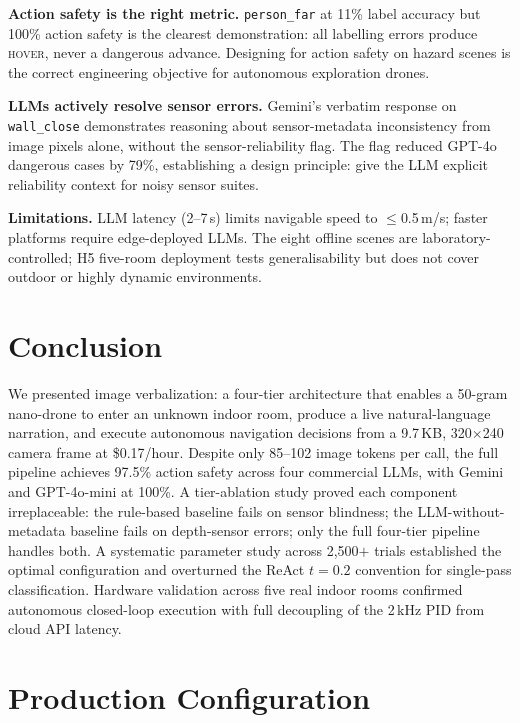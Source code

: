 \documentclass[journal]{IEEEtran}
\begin{document}
\textbf{Action safety is the right metric.}
\texttt{person\_far} at 11\% label accuracy but 100\% action
safety is the clearest demonstration: all labelling errors produce
\textsc{hover}, never a dangerous advance.
Designing for action safety on hazard scenes is the correct
engineering objective for autonomous exploration drones.

\textbf{LLMs actively resolve sensor errors.}
Gemini's verbatim response on \texttt{wall\_close} demonstrates
reasoning about sensor-metadata inconsistency from image pixels
alone, without the sensor-reliability flag.
The flag reduced GPT-4o dangerous cases by 79\%, establishing a
design principle: give the LLM explicit reliability context for
noisy sensor suites.

\textbf{Limitations.}
LLM latency (2--7\,s) limits navigable speed to $\leq$0.5\,m/s;
faster platforms require edge-deployed LLMs.
The eight offline scenes are laboratory-controlled; H5
five-room deployment tests generalisability but does not cover
outdoor or highly dynamic environments.

\section{Conclusion}
\label{sec:conclusion}

We presented image verbalization: a four-tier architecture that
enables a 50-gram nano-drone to enter an unknown indoor room,
produce a live natural-language narration, and execute autonomous
navigation decisions from a 9.7\,KB, 320$\times$240 camera frame
at \$0.17/hour.
Despite only 85--102 image tokens per call, the full pipeline
achieves 97.5\% action safety across four commercial LLMs, with
Gemini and GPT-4o-mini at 100\%.
A tier-ablation study proved each component irreplaceable: the
rule-based baseline fails on sensor blindness; the
LLM-without-metadata baseline fails on depth-sensor errors; only
the full four-tier pipeline handles both.
A systematic parameter study across 2,500$+$ trials established
the optimal configuration and overturned the ReAct $t=0.2$
convention for single-pass classification.
Hardware validation across five real indoor rooms confirmed
autonomous closed-loop execution with full decoupling of the
2\,kHz PID from cloud API latency.

\appendix
\section{Production Configuration}
\label{sec:config}
\end{document}
